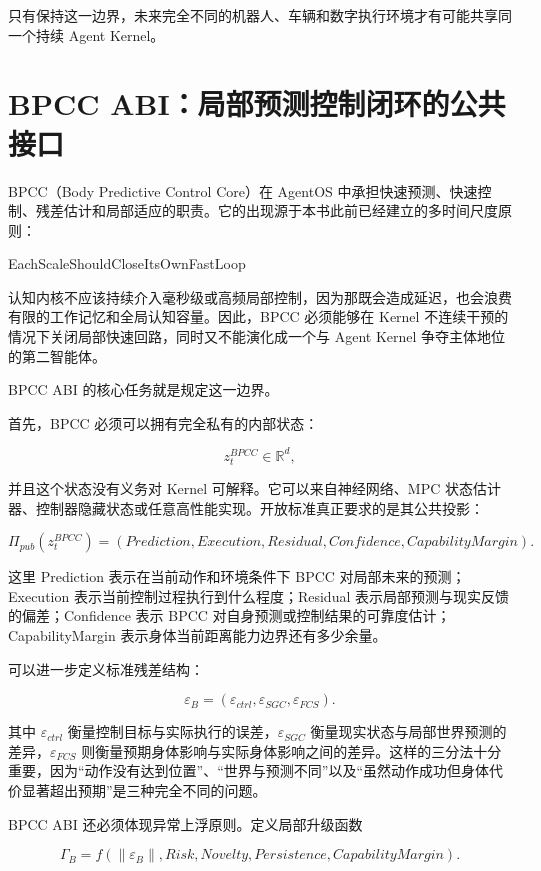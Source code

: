 只有保持这一边界，未来完全不同的机器人、车辆和数字执行环境才有可能共享同一个持续 Agent Kernel。

\section{BPCC ABI：局部预测控制闭环的公共接口}

BPCC（Body Predictive Control Core）在 AgentOS 中承担快速预测、快速控制、残差估计和局部适应的职责。它的出现源于本书此前已经建立的多时间尺度原则：

\begin{statementbox}
EachScaleShouldCloseItsOwnFastLoop
\end{statementbox}

认知内核不应该持续介入毫秒级或高频局部控制，因为那既会造成延迟，也会浪费有限的工作记忆和全局认知容量。因此，BPCC 必须能够在 Kernel 不连续干预的情况下关闭局部快速回路，同时又不能演化成一个与 Agent Kernel 争夺主体地位的第二智能体。

BPCC ABI 的核心任务就是规定这一边界。

首先，BPCC 必须可以拥有完全私有的内部状态：

\[
z_t^{BPCC}\in\mathbb R^d,
\]

并且这个状态没有义务对 Kernel 可解释。它可以来自神经网络、MPC 状态估计器、控制器隐藏状态或任意高性能实现。开放标准真正要求的是其公共投影：

\[
\Pi_{pub}
(
z_t^{BPCC}
)
=
(
Prediction,
Execution,
Residual,
Confidence,
CapabilityMargin
).
\]

这里 Prediction 表示在当前动作和环境条件下 BPCC 对局部未来的预测；Execution 表示当前控制过程执行到什么程度；Residual 表示局部预测与现实反馈的偏差；Confidence 表示 BPCC 对自身预测或控制结果的可靠度估计；CapabilityMargin 表示身体当前距离能力边界还有多少余量。

可以进一步定义标准残差结构：

\[
\varepsilon_B
=
\left(
\varepsilon_{ctrl},
\varepsilon_{SGC},
\varepsilon_{FCS}
\right).
\]

其中 $\varepsilon_{ctrl}$ 衡量控制目标与实际执行的误差，$\varepsilon_{SGC}$ 衡量现实状态与局部世界预测的差异，$\varepsilon_{FCS}$ 则衡量预期身体影响与实际身体影响之间的差异。这样的三分法十分重要，因为``动作没有达到位置''、``世界与预测不同''以及``虽然动作成功但身体代价显著超出预期''是三种完全不同的问题。

BPCC ABI 还必须体现异常上浮原则。定义局部升级函数

\[
\Gamma_B
=
f
(
\|\varepsilon_B\|,
Risk,
Novelty,
Persistence,
CapabilityMargin
).
\]

